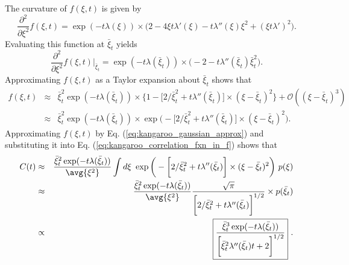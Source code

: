 The curvature of $f(\xi, t)$ is given by
\begin{equation}
\frac{\partial^2}{\partial \xi^2} f(\xi, t) = \exp(-t \lambda(\xi)) \times \bigg( 2 - 4 \xi  t \lambda'(\xi)  - t  \lambda''(\xi) \xi^2  + (\xi  t \lambda')^2 \bigg). \nonumber
\end{equation}
Evaluating this function at $\bar{\xi}_t$ yields
\begin{equation}
\frac{\partial^2}{\partial \xi^2} f(\xi, t) \bigg|_{\bar{\xi}_t} =  \exp(- t \lambda(\bar{\xi}_t)) \times \bigg(-2 -  t \lambda''(\bar{\xi}_t) \bar{\xi}_t^2\bigg). \nonumber
\end{equation}
Approximating $f(\xi, t)$ as a Taylor expansion about $\bar{\xi}_t$ shows that
\begin{eqnarray}
f(\xi, t)  &\approx &  \bar{\xi}_t^2 \exp(- t \lambda(\bar{\xi}_t)) \times \bigg\{1 -\bigg[2/\bar{\xi}_t^2 +  t \lambda''(\bar{\xi}_t)\bigg] \times (\xi - \bar{\xi}_t)^2  \bigg\} + \mathcal{O}((\xi - \bar{\xi}_t)^3) \nonumber \\
&\approx & \bar{\xi}_t^2 \exp(- t \lambda(\bar{\xi}_t)) \times \exp\bigg(-\bigg[2/\bar{\xi}_t^2 +  t \lambda''(\bar{\xi}_t)\bigg] \times (\xi - \bar{\xi}_t)^2\bigg). \label{eq:kangaroo_gaussian_approx}
\end{eqnarray}
Approximating $f(\xi, t)$ by Eq. (\ref{eq:kangaroo_gaussian_approx}) and substituting it into Eq. (\ref{eq:kangaroo_correlation_fxn_in_f}) shows that
\begin{eqnarray}
C(t) &\approx& \frac{\bar{\xi}_t^2 \exp(-t \lambda(\bar{\xi}_t))}{\avg{\xi^2}} \int d \xi~  \exp\bigg(-\bigg[2/\bar{\xi}_t^2 +  t \lambda''(\bar{\xi}_t)\bigg] \times (\xi - \bar{\xi}_t)^2\bigg) ~p(\xi) \nonumber  \\
&\approx&  \frac{\bar{\xi}_t^2 \exp(- t \lambda(\bar{\xi}_t))}{\avg{\xi^2}} \frac{\sqrt{\pi}}{\bigg[2/\bar{\xi}_t^2+  t \lambda''(\bar{\xi}_t) \bigg]^{1/2}} \times p(\bar{\xi}_t) \nonumber \\
&\propto& \boxed{ \frac{\bar{\xi}_t^3 \exp(- t \lambda(\bar{\xi}_t))}{\bigg[\bar{\xi}_t^2  \lambda''(\bar{\xi}_t)  t + 2 \bigg]^{1/2}} }~.
\end{eqnarray}